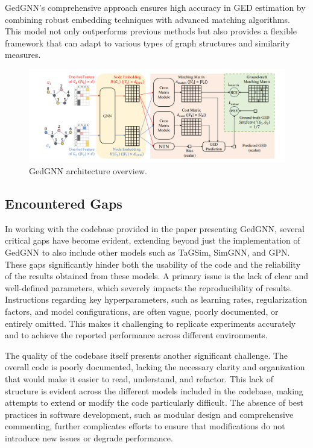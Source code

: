 \documentclass[../Thesis.tex]{subfiles}
\begin{document}
	GedGNN’s comprehensive approach ensures high accuracy in GED estimation by combining robust embedding techniques with advanced matching algorithms. This model not only outperforms previous methods but also provides a flexible framework that can adapt to various types of graph structures and similarity measures.
	
	\begin{figure}[H]
		\centering
		\includegraphics[width=\textwidth]{Images/gedgnn_architecture.png}
		\caption{GedGNN architecture overview.}
		\label{fig:gedgnn_architecture}
	\end{figure}
	
	\subsection{Encountered Gaps}
	
	In working with the codebase provided in the paper presenting GedGNN, several critical gaps have become evident, extending beyond just the implementation of GedGNN to also include other models such as TaGSim, SimGNN, and GPN. These gaps significantly hinder both the usability of the code and the reliability of the results obtained from these models. A primary issue is the lack of clear and well-defined parameters, which severely impacts the reproducibility of results. Instructions regarding key hyperparameters, such as learning rates, regularization factors, and model configurations, are often vague, poorly documented, or entirely omitted. This makes it challenging to replicate experiments accurately and to achieve the reported performance across different environments.
	
	The quality of the codebase itself presents another significant challenge. The overall code is poorly documented, lacking the necessary clarity and organization that would make it easier to read, understand, and refactor. This lack of structure is evident across the different models included in the codebase, making attempts to extend or modify the code particularly difficult. The absence of best practices in software development, such as modular design and comprehensive commenting, further complicates efforts to ensure that modifications do not introduce new issues or degrade performance.
	
\end{document}
